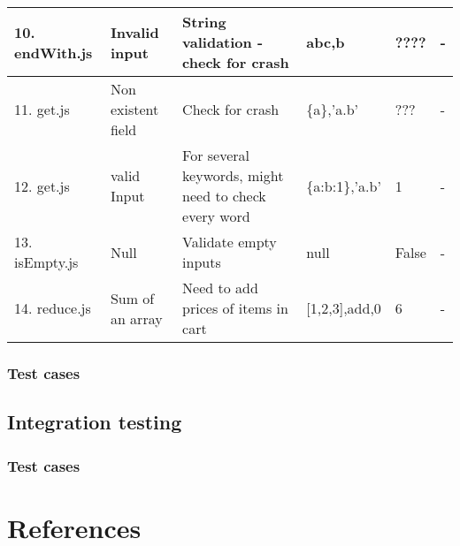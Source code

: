 \documentclass[a4paper, 12pt]{article}
\begin{document}
\begin{table}[h]
{\begin{tabular}{|p{3cm}|p{2cm}|p{4cm}|p{2cm}|p{2cm}|p{2cm}|}
    10. endWith.js   & Invalid input                           & String validation - check for crash                        & abc,b                                          & ????                     & -             \\ \hline
    11. get.js       & Non  existent field                     & Check for crash                                        	& \{a\},'a.b'                                    & ???                      & -             \\ \hline
    12. get.js       & valid Input                             & For several keywords, might need to check every word       & \{a:b:1\},'a.b'                                & 1                        & -             \\ \hline
    13. isEmpty.js   & Null                                    & Validate empty inputs                                      & null                                           & False                    & -             \\ \hline
    14. reduce.js    & Sum of an array                         & Need to add prices of items in cart                        & {[}1,2,3{]},add,0                              & 6                        & -             \\ \hline
\end{tabular}}
\end{table}

\subsubsection{Test cases}

\subsection{Integration testing}

\subsubsection{Test cases}

\section{References}

  

   
\end{document}
